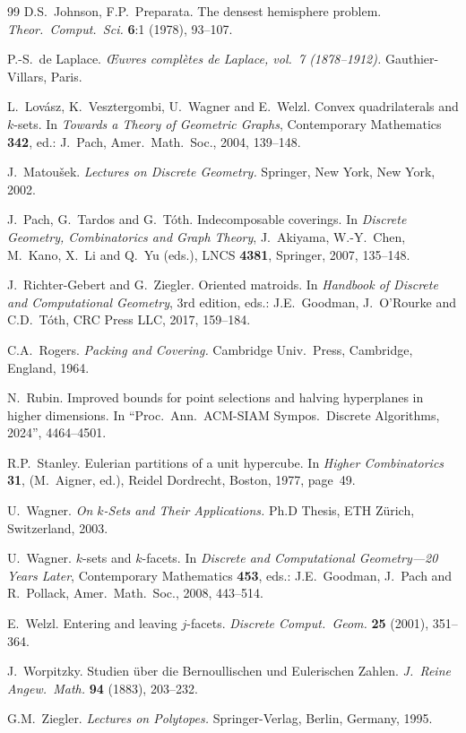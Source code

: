 \begin{thebibliography}{99}
{\sc D.S.\ Johnson, F.P.\ Preparata.}
The densest hemisphere problem. \emph{Theor.\ Comput.\ Sci.} {\bf 6}:1 (1978), 93--107.


{\sc P.-S.\ de Laplace.} 
\emph{{\OE}uvres compl\`etes de Laplace, vol.\ 7 (1878--1912).} Gauthier-Villars, Paris.

{\sc L.\ Lov\'asz, K.\ Vesztergombi, U.\ Wagner and E.\ Welzl.} Convex quadrilaterals and $k$-sets.
In \emph{Towards a Theory of Geometric Graphs}, Contemporary Mathematics {\bf 342}, ed.: J.\ Pach, Amer.\ Math.\ Soc., 2004,  139--148.

{\sc J.\ Matou\v{s}ek.}
\emph{Lectures on Discrete Geometry.}
Springer, New York, New York, 2002.

{\sc J.\ Pach, G.\ Tardos and G.\ T\'{o}th.}
Indecomposable coverings.
In \emph{Discrete Geometry, Combinatorics and Graph Theory}, J.\ Akiyama, W.-Y.\ Chen, M.\ Kano, X.\ Li and Q.\ Yu (eds.), LNCS {\bf 4381}, Springer, 2007, 135--148.

{\sc J.\ Richter-Gebert and G.\ Ziegler.}
Oriented matroids.
In \emph{Handbook of Discrete and Computational Geometry}, 3rd edition, eds.: J.E.\ Goodman, J.\ O'Rourke and C.D.\ T\'oth, CRC Press LLC, 2017, 159--184.

{\sc C.A.\ Rogers.}
\emph{Packing and Covering.}
Cambridge Univ.\ Press, Cambridge, England, 1964.

{\sc N.\ Rubin.}
Improved bounds for point selections and halving hyperplanes in higher dimensions.
In ``Proc.\ Ann.\ ACM-SIAM Sympos.\ Discrete Algorithms, 2024'', 4464--4501.

{\sc R.P.\ Stanley.}
Eulerian partitions of a unit hypercube.
In \emph{Higher Combinatorics} {\bf 31}, (M.\ Aigner, ed.), Reidel Dordrecht, Boston, 1977, page~49.

{\sc U.\ Wagner.}
\emph{On $k$-Sets and Their Applications.}
Ph.D Thesis, ETH Z\"urich, Switzerland, 2003.   

{\sc U.\ Wagner.}
$k$-sets and $k$-facets.
In \emph{Discrete and Computational Geometry---20 Years Later}, Contemporary Mathematics {\bf 453}, eds.: J.E.\ Goodman, J.\ Pach and R.\ Pollack, Amer.\ Math.\ Soc., 2008, 443--514.

{\sc E.\ Welzl.}
Entering and leaving $j$-facets.
\emph{Discrete Comput.\ Geom.} {\bf 25} (2001), 351--364.

{\sc J.\ Worpitzky.}
Studien über die Bernoullischen und Eulerischen Zahlen.
\emph{J.\ Reine Angew.\ Math.} {\bf 94} (1883), 203--232.

{\sc G.M.\ Ziegler.}
\emph{Lectures on Polytopes.}
Springer-Verlag, Berlin, Germany, 1995.

\end{thebibliography}
